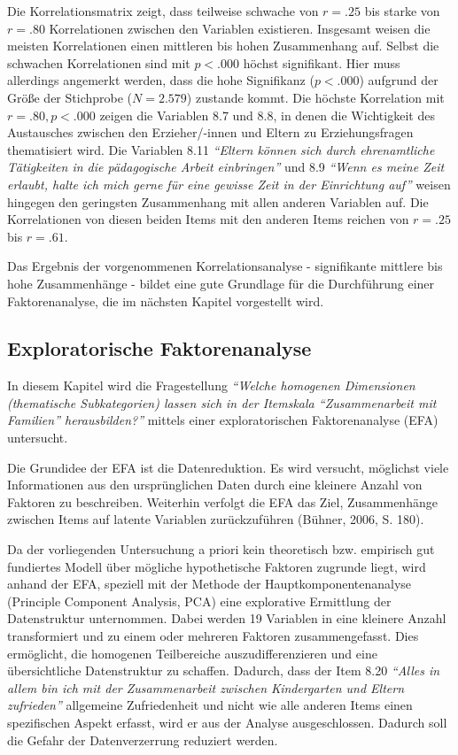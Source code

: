 \documentclass[12pt,a4paper]{article}
\begin{document}
	Die Korrelationsmatrix zeigt, dass teilweise schwache von $r = .25$ bis starke von $r = .80$ Korrelationen zwischen den Variablen existieren. Insgesamt weisen die meisten Korrelationen einen mittleren bis hohen Zusammenhang auf. Selbst die schwachen Korrelationen sind mit $p < .000$ höchst signifikant. Hier muss allerdings angemerkt werden, dass die hohe Signifikanz ($p < .000$) aufgrund der Größe der Stichprobe ($N= 2.579$) zustande kommt. Die höchste Korrelation mit $r = .80, p < .000$ zeigen die Variablen 8.7 und 8.8, in denen die Wichtigkeit des Austausches zwischen den Erzieher/-innen und Eltern zu Erziehungsfragen thematisiert wird. Die Variablen 8.11 \textit{"`Eltern können sich durch ehrenamtliche Tätigkeiten in die pädagogische Arbeit einbringen"'} und 8.9 \textit{"`Wenn es meine Zeit erlaubt, halte ich mich gerne für eine gewisse Zeit in der Einrichtung auf"'} weisen hingegen den geringsten Zusammenhang mit allen anderen Variablen auf. Die Korrelationen von diesen beiden Items mit den anderen Items reichen von $r = .25$ bis $r = .61$.
	
	Das Ergebnis der vorgenommenen Korrelationsanalyse - signifikante mittlere bis hohe Zusammenhänge - bildet eine gute Grundlage für die Durchführung einer Faktorenanalyse, die im nächsten Kapitel vorgestellt wird.

\subsection{Exploratorische Faktorenanalyse} 
In diesem Kapitel wird die Fragestellung \textit{"`Welche homogenen Dimensionen  (thematische Subkategorien) lassen sich in der Itemskala "`Zusammenarbeit mit Familien"' herausbilden?"'} mittels einer exploratorischen Faktorenanalyse (EFA) untersucht.

	Die Grundidee der EFA ist die Datenreduktion. Es wird versucht, möglichst viele Informationen aus den ursprünglichen Daten durch eine kleinere Anzahl von Faktoren zu beschreiben. Weiterhin verfolgt die EFA das Ziel, Zusammenhänge zwischen Items auf latente Variablen zurückzuführen (Bühner, 2006, S. 180).
	
	Da der vorliegenden Untersuchung a priori kein theoretisch bzw. empirisch gut fundiertes Modell über mögliche hypothetische Faktoren zugrunde liegt, wird anhand der EFA, speziell mit der Methode der Hauptkomponentenanalyse (Principle Component Analysis, PCA) eine explorative Ermittlung der Datenstruktur unternommen. Dabei werden 19 Variablen in eine kleinere Anzahl transformiert und zu einem oder mehreren Faktoren zusammengefasst. Dies ermöglicht, die homogenen Teilbereiche auszudifferenzieren und eine übersichtliche Datenstruktur zu schaffen. Dadurch, dass der Item 8.20 \textit{"`Alles in allem bin ich mit der Zusammenarbeit zwischen Kindergarten und Eltern zufrieden"'} allgemeine Zufriedenheit und nicht wie alle anderen Items einen spezifischen Aspekt erfasst, wird er aus der Analyse ausgeschlossen. Dadurch soll die Gefahr der Datenverzerrung reduziert werden.
\end{document}
